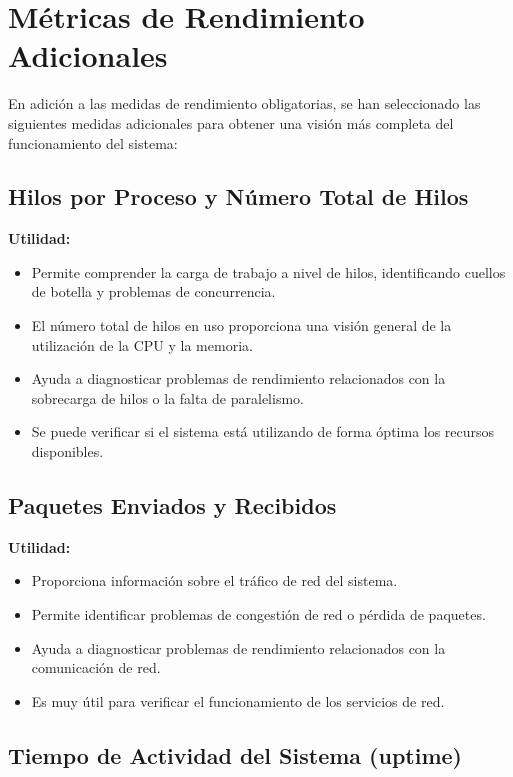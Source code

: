 \documentclass{article}
\begin{document}
\section{Métricas de Rendimiento Adicionales}

En adición a las medidas de rendimiento obligatorias, se han seleccionado las siguientes medidas adicionales para obtener una visión más completa del funcionamiento del sistema:

\subsection{Hilos por Proceso y Número Total de Hilos}

\textbf{Utilidad:}
\begin{itemize}
    \item Permite comprender la carga de trabajo a nivel de hilos, identificando cuellos de botella y problemas de concurrencia.
    \item El número total de hilos en uso proporciona una visión general de la utilización de la CPU y la memoria.
    \item Ayuda a diagnosticar problemas de rendimiento relacionados con la sobrecarga de hilos o la falta de paralelismo.
    \item Se puede verificar si el sistema está utilizando de forma óptima los recursos disponibles.
\end{itemize}


\subsection{Paquetes Enviados y Recibidos}

\textbf{Utilidad:}
\begin{itemize}
    \item Proporciona información sobre el tráfico de red del sistema.
    \item Permite identificar problemas de congestión de red o pérdida de paquetes.
    \item Ayuda a diagnosticar problemas de rendimiento relacionados con la comunicación de red.
    \item Es muy útil para verificar el funcionamiento de los servicios de red.
\end{itemize}

\subsection{Tiempo de Actividad del Sistema (uptime)}
\end{document}
